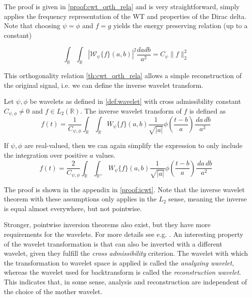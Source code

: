The proof is given in \ref{proof:cwt_orth_rela} and is very straightforward, simply applies the frequency representation of the WT and properties of 
the Dirac delta.
Note that choosing $\psi = \phi$ and $f = g$ yields the energy preserving relation (up to a constant)

\begin{equation}
    \int_{\mathbb{R}} \int_{\mathbb{R}} |\mathscr{W}_{\psi}\{f\}(a,b)|^2 \frac{da db }{a^2} = C_{\psi} \|f\|_2^2
\end{equation}

This orthogonality relation \ref{th:cwt_orth_rela} allows a simple reconstruction of the original signal, i.e. we can define the inverse wavelet transform.

\begin{definition}
    Let $\psi, \phi$ be wavelets as defined in \ref{def:wavelet} with cross admissibility constant $C_{\psi, \phi} \neq 0$ and $f \in L_2(\mathbb{R})$. The inverse wavelet transform
    of $f$ is defined as 
    \begin{equation}
        f(t) = \frac{1}{C_{\psi, \phi}} \int_{\mathbb{R}} \int_{\mathbb{R}} W_{\psi}\{f\}(a, b) \frac{1}{\sqrt{|a|}} \phi \left(\frac{t - b}{a}\right)  \frac{\,da \,db}{a^2}
        \label{eq:icwt}
    \end{equation}

    If $\psi, \phi$ are real-valued, then we can again simplify the expression to only include the integration over positive $a$ values.
    \begin{equation}
        f(t) = \frac{2}{C_{\psi, \phi}} \int_{\mathbb{R}} \int_{\mathbb{R^{+}}} W_{\psi}\{f\}(a, b) \frac{1}{\sqrt{|a|}} \phi \left(\frac{t - b}{a}\right)  \frac{\,da \,db}{a^2}
        \label{eq:icwt_real}
    \end{equation}
    \label{def:icwt}
\end{definition}

The proof is shown in the appendix in \ref{proof:icwt}. Note that the inverse wavelet theorem with these assumptions only applies in the $L_2$ sense,
meaning the inverse is equal almost everywhere, but not pointwise.

Stronger, pointwise inversion theorems also exist, but they have more requirements for the wavelets. For more details see e.g. \cite{daubechies1992ten}. An 
interesting property of the wavelet transformation is that can also be inverted with a different wavelet, given they fulfill the 
\textit{cross admissibility} criterion. The wavelet with which the transformation to wavelet space is applied is called the \textit{analyzing wavelet}, whereas
the wavelet used for backtransform is called the \textit{reconstruction wavelet}. This indicates that, in some sense, analysis and reconstruction are independent
of the choice of the mother wavelet.

